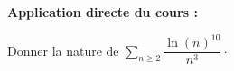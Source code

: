 \documentclass[french,11pt,twoside]{VcCours}
\newenvironment{ApplicationDirecte}{\textbf{Application directe du cours :}

}{}
\newcommand{\Sum}[2]{\ensuremath{\textstyle{\sum\limits_{#1}^{#2}}}}
\begin{document}
\begin{ApplicationDirecte} Donner la nature de $\Sum{n \geq 2}{} \dfrac{\ln(n)^{10}}{n^{3}} \cdot$
\end{ApplicationDirecte} 


%
%
%
%
%
%
%
%
%
%
%
\end{document}
